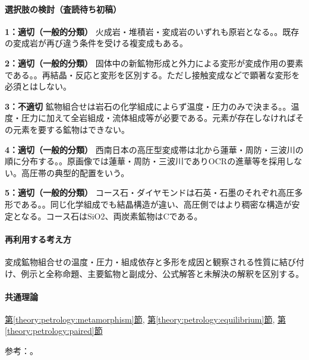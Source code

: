 \paragraph{選択肢の検討（査読待ち初稿）}\mbox{}\par

\noindent\textbf{1：適切（一般的分類）} 火成岩・堆積岩・変成岩のいずれも原岩となる。。既存の変成岩が再び違う条件を受ける複変成もある。\par

\noindent\textbf{2：適切（一般的分類）} 固体中の新鉱物形成と外力による変形が変成作用の要素である。。再結晶・反応と変形を区別する。ただし接触変成などで顕著な変形を必須とはしない。\par

\noindent\textbf{3：不適切} 鉱物組合せは岩石の化学組成によらず温度・圧力のみで決まる。。温度・圧力に加えて全岩組成・流体組成等が必要である。元素が存在しなければその元素を要する鉱物はできない。\par

\noindent\textbf{4：適切（一般的分類）} 西南日本の高圧型変成帯は北から蓮華・周防・三波川の順に分布する。。原画像では蓮華・周防・三波川でありOCRの進華等を採用しない。高圧帯の典型的配置をいう。\par

\noindent\textbf{5：適切（一般的分類）} コース石・ダイヤモンドは石英・石墨のそれぞれ高圧多形である。。同じ化学組成でも結晶構造が違い、高圧側ではより稠密な構造が安定となる。コース石はSiO2、両炭素鉱物はCである。\par

\paragraph{再利用する考え方} 変成鉱物組合せの温度・圧力・組成依存と多形を成因と観察される性質に結び付け、例示と全称命題、主要鉱物と副成分、公式解答と未解決の解釈を区別する。

\paragraph{共通理論} \hyperref[theory:petrology:metamorphism]{第\ref*{theory:petrology:metamorphism}節}, \hyperref[theory:petrology:equilibrium]{第\ref*{theory:petrology:equilibrium}節}, \hyperref[theory:petrology:paired]{第\ref*{theory:petrology:paired}節}

\par 参考：\cite{nelson_assemblages2011,gsj_metamorphic_words,gsj_highpressure2016,hokkaido_polymorph2012}。

